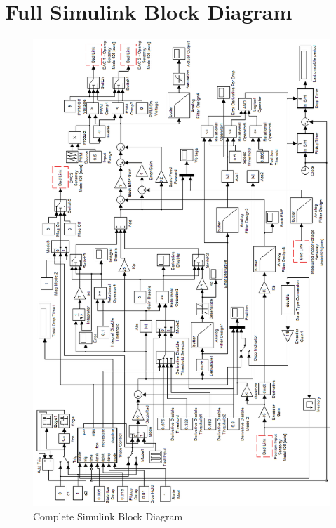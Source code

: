 \chapter{Full Simulink Block Diagram}
\label{sec:fullsimulink}

\begin{figure}[htp]
    \centering
    \includegraphics[width=.7\textwidth]{images/Complete.PNG}
    \caption{Complete Simulink Block Diagram}
    \label{fig:fullsimulink}
\end{figure}
